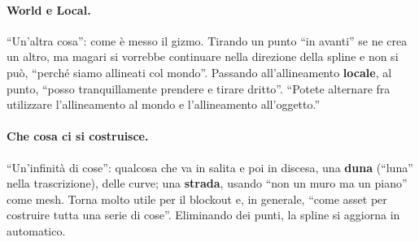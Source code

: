 \paragraph{World e Local.} ``Un'altra cosa'': come è messo il gizmo. Tirando un punto ``in
avanti'' se ne crea un altro, ma magari si vorrebbe continuare nella direzione della spline e
non si può, ``perché siamo allineati col mondo''. Passando all'allineamento \textbf{locale}, al
punto, ``posso tranquillamente prendere e tirare dritto''. ``Potete alternare fra utilizzare
l'allineamento al mondo e l'allineamento all'oggetto.''

\paragraph{Che cosa ci si costruisce.} ``Un'infinità di cose'': qualcosa che va in salita e
poi in discesa, una \textbf{duna} (``luna'' nella trascrizione), delle curve; una
\textbf{strada}, usando ``non un muro ma un piano'' come mesh. Torna molto utile per il blockout
e, in generale, ``come asset per costruire tutta una serie di cose''. Eliminando dei punti, la
spline si aggiorna in automatico.

